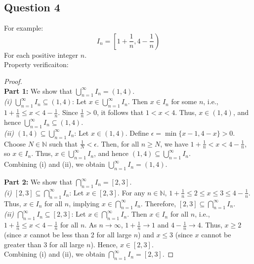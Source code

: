 \documentclass{article}
\begin{document}
\subsection*{Question 4}
For example:
\[ I_n = \left[ 1 + \frac{1}{n}, 4 - \frac{1}{n} \right) \]
For each positive integer $n$.
\\
Property verificaiton:
\begin{proof}
    \\
    \textbf{Part 1:} We show that \(\displaystyle \bigcup_{n=1}^{\infty} I_n = (1, 4)\).
    \\
    \textit{(i) \(\bigcup_{n=1}^{\infty} I_n \subseteq (1, 4)\)}:  
    Let \( x \in \bigcup_{n=1}^{\infty} I_n \). Then \( x \in I_n \) for some \( n \), i.e., \( 1 + \frac{1}{n} \leq x < 4 - \frac{1}{n} \). Since \( \frac{1}{n} > 0 \), it follows that \( 1 < x < 4 \). Thus, \( x \in (1, 4) \), and hence \(\bigcup_{n=1}^{\infty} I_n \subseteq (1, 4)\).
    \\
    \textit{(ii) \((1, 4) \subseteq \bigcup_{n=1}^{\infty} I_n\)}:  
    Let \( x \in (1, 4) \). Define \( \epsilon = \min\{ x - 1, 4 - x \} > 0 \). Choose \( N \in \mathbb{N} \) such that \( \frac{1}{N} < \epsilon \). Then, for all \( n \geq N \), we have \( 1 + \frac{1}{n} < x < 4 - \frac{1}{n} \), so \( x \in I_n \). Thus, \( x \in \bigcup_{n=1}^{\infty} I_n \), and hence \((1, 4) \subseteq \bigcup_{n=1}^{\infty} I_n\).
    \\
    Combining (i) and (ii), we obtain \(\bigcup_{n=1}^{\infty} I_n = (1, 4)\).
    
    \medskip
    
    \textbf{Part 2:} We show that \(\displaystyle \bigcap_{n=1}^{\infty} I_n = [2, 3]\).
    \\
    \textit{(i) \([2, 3] \subseteq \bigcap_{n=1}^{\infty} I_n\)}:  
    Let \( x \in [2, 3] \). For any \( n \in \mathbb{N} \), \( 1 + \frac{1}{n} \leq 2 \leq x \leq 3 \leq 4 - \frac{1}{n} \). Thus, \( x \in I_n \) for all \( n \), implying \( x \in \bigcap_{n=1}^{\infty} I_n \). Therefore, \([2, 3] \subseteq \bigcap_{n=1}^{\infty} I_n\).
    \\
    \textit{(ii) \(\bigcap_{n=1}^{\infty} I_n \subseteq [2, 3]\)}:  
    Let \( x \in \bigcap_{n=1}^{\infty} I_n \). Then \( x \in I_n \) for all \( n \), i.e., \( 1 + \frac{1}{n} \leq x < 4 - \frac{1}{n} \) for all \( n \). As \( n \to \infty \), \( 1 + \frac{1}{n} \to 1 \) and \( 4 - \frac{1}{n} \to 4 \). Thus, \( x \geq 2 \) (since \( x \) cannot be less than 2 for all large \( n \)) and \( x \leq 3 \) (since \( x \) cannot be greater than 3 for all large \( n \)). Hence, \( x \in [2, 3] \).
    \\
    Combining (i) and (ii), we obtain \(\bigcap_{n=1}^{\infty} I_n = [2, 3]\).
    
    \end{proof}
\end{document}
